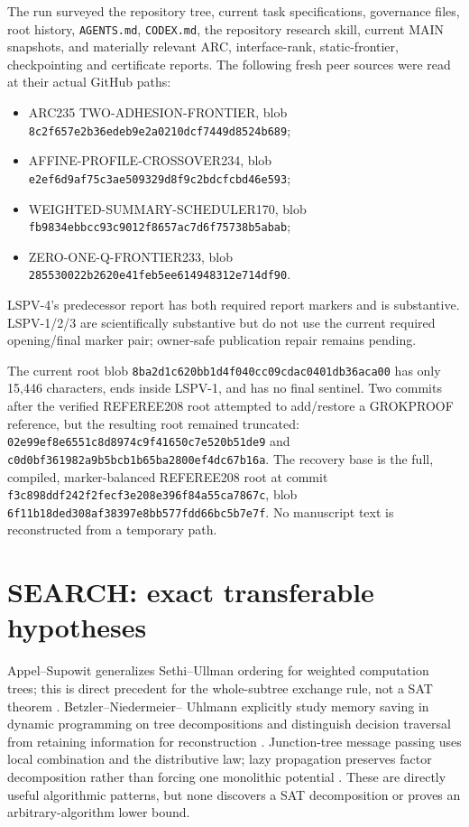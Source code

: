 \documentclass[11pt]{article}
\begin{document}
The run surveyed the repository tree, current task specifications, governance files, root history,
\texttt{AGENTS.md}, \texttt{CODEX.md}, the repository research skill, current MAIN snapshots, and
materially relevant ARC, interface-rank, static-frontier, checkpointing and certificate reports.
The following fresh peer sources were read at their actual GitHub paths:
\begin{itemize}
\item ARC235 TWO-ADHESION-FRONTIER, blob
\texttt{8c2f657e2b36edeb9e2a0210dcf7449d8524b689};
\item AFFINE-PROFILE-CROSSOVER234, blob
\texttt{e2ef6d9af75c3ae509329d8f9c2bdcfcbd46e593};
\item WEIGHTED-SUMMARY-SCHEDULER170, blob
\texttt{fb9834ebbcc93c9012f8657ac7d6f75738b5abab};
\item ZERO-ONE-Q-FRONTIER233, blob
\texttt{285530022b2620e41feb5ee614948312e714df90}.
\end{itemize}
LSPV-4's predecessor report has both required report markers and is substantive.  LSPV-1/2/3 are
scientifically substantive but do not use the current required opening/final marker pair; owner-safe
publication repair remains pending.

The current root blob \texttt{8ba2d1c620bb1d4f040cc09cdac0401db36aca00} has only 15,446
characters, ends inside LSPV-1, and has no final sentinel.  Two commits after the verified REFEREE208
root attempted to add/restore a GROKPROOF reference, but the resulting root remained truncated:
\texttt{02e99ef8e6551c8d8974c9f41650c7e520b51de9} and
\texttt{c0d0bf361982a9b5bcb1b65ba2800ef4dc67b16a}.  The recovery base is the full, compiled,
marker-balanced REFEREE208 root at commit
\texttt{f3c898ddf242f2fecf3e208e396f84a55ca7867c}, blob
\texttt{6f11b18ded308af38397e8bb577fdd66bc5b7e7f}.  No manuscript text is reconstructed from a
temporary path.

\section{SEARCH: exact transferable hypotheses}

Appel--Supowit generalizes Sethi--Ullman ordering for weighted computation trees; this is direct
precedent for the whole-subtree exchange rule, not a SAT theorem \cite{AS}.  Betzler--Niedermeier--
Uhlmann explicitly study memory saving in dynamic programming on tree decompositions and distinguish
decision traversal from retaining information for reconstruction \cite{BNU}.  Junction-tree message
passing uses local combination and the distributive law; lazy propagation preserves factor
decomposition rather than forcing one monolithic potential \cite{JT,Lazy}.  These are directly useful
algorithmic patterns, but none discovers a SAT decomposition or proves an arbitrary-algorithm lower
bound.
\end{document}
